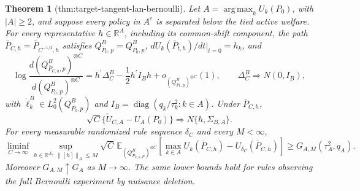 \documentclass{article}
\newtheorem{theorem}{Theorem}
\begin{document}
\begin{theorem}[thm:target-tangent-lan-bernoulli]\label{thm:target-tangent-lan-bernoulli}
Let \(A=\operatorname*{arg\,max}_kU_k(P_0)\), with \(|A|\geq2\), and suppose every policy in \(A^c\) is separated below the tied active welfare.  For every representative \(h\in\mathbb R^A\), including its common-shift component, the path \(\bar P_{C,h}=\bar P_{C^{-1/2},h}\) satisfies \(Q^B_{\bar P_0,p}=Q^B_{P_0,p}\), \(dU_k(\bar P_{t,h})/dt|_{t=0}=h_k\), and
\[
\log\frac{d(Q^B_{\bar P_{C,h},p})^{\otimes C}}{d(Q^B_{P_0,p})^{\otimes C}}
=h^{\prime}\Delta_C^B-\frac12h^{\prime}I_Bh+o_{(Q^B_{P_0,p})^{\otimes C}}(1),
\qquad \Delta_C^B\Rightarrow N(0,I_B),
\]
with \(\dot\ell_k^B\in L^2_0(Q^B_{P_0,p})\) and \(I_B=\operatorname{diag}(q_k/\tau_k^2:k\in A)\).  Under \(\bar P_{C,h}\),
\[
\sqrt C\{\widetilde U_{C,A}-U_A(P_0)\}\Rightarrow
N\{h,\Sigma_{B,A}\}.
\]
For every measurable randomized rule sequence \(\delta_C\) and every \(M<\infty\),
\[
\liminf_{C\to\infty}\sup_{h\in\mathbb R^A:\ \lVert[h]\rVert_A\leq M}
\sqrt C\,\mathbb E_{(Q^B_{\bar P_{C,h},p})^{\otimes C}}
\left[\max_{k\in A}U_k(\bar P_{C,h})-U_{\delta_C}(\bar P_{C,h})\right]
\geq G_{A,M}(\tau_A^2,q_A).
\]
Moreover \(G_{A,M}\uparrow G_A\) as \(M\to\infty\).  The same lower bounds hold for rules observing the full Bernoulli experiment by nuisance deletion.
\end{theorem}
\end{document}

